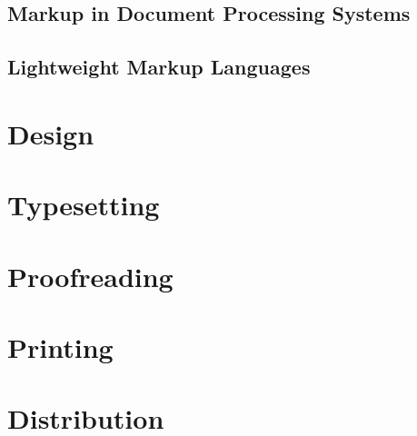 \documentclass{book}
\begin{document}
          

        
      \section{Markup in Document Processing Systems}

      \section{Lightweight Markup Languages}

    \chapter{Design}
    \chapter{Typesetting}
    \chapter{Proofreading}
    \chapter{Printing}
    \chapter{Distribution}
\end{document}
